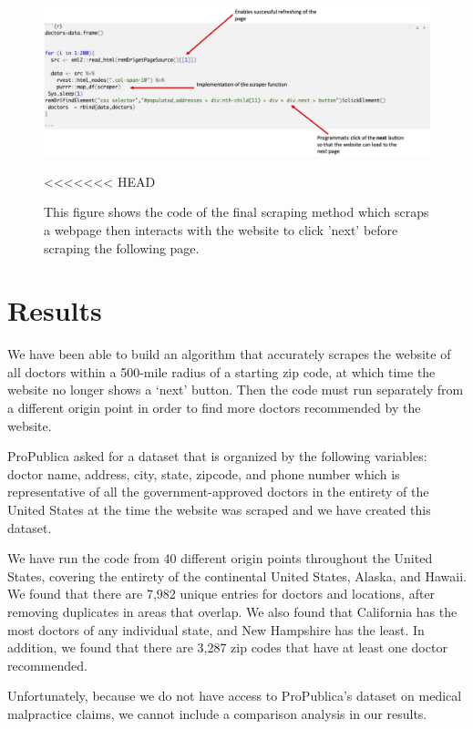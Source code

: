 \documentclass[10pt,letterpaper]{article}
\begin{document}
\begin{figure}
\includegraphics[width=1\linewidth]{final_scrape} \caption{This figure shows the code of the final scraping method which scraps a webpage then interacts with the website to click 'next' before scraping the following page.}\label{fig:unnamed-chunk-4}
<<<<<<< HEAD
\end{figure}

\hypertarget{results}{%
\section{Results}\label{results}}

We have been able to build an algorithm that accurately scrapes the
website of all doctors within a 500-mile radius of a starting zip code,
at which time the website no longer shows a `next' button. Then the code
must run separately from a different origin point in order to find more
doctors recommended by the website.

ProPublica asked for a dataset that is organized by the following
variables: doctor name, address, city, state, zipcode, and phone number
which is representative of all the government-approved doctors in the
entirety of the United States at the time the website was scraped and we
have created this dataset.

We have run the code from 40 different origin points throughout the
United States, covering the entirety of the continental United States,
Alaska, and Hawaii. We found that there are 7,982 unique entries for
doctors and locations, after removing duplicates in areas that overlap.
We also found that California has the most doctors of any individual
state, and New Hampshire has the least. In addition, we found that there
are 3,287 zip codes that have at least one doctor recommended.

Unfortunately, because we do not have access to ProPublica's dataset on
medical malpractice claims, we cannot include a comparison analysis in
our results.
\end{document}
